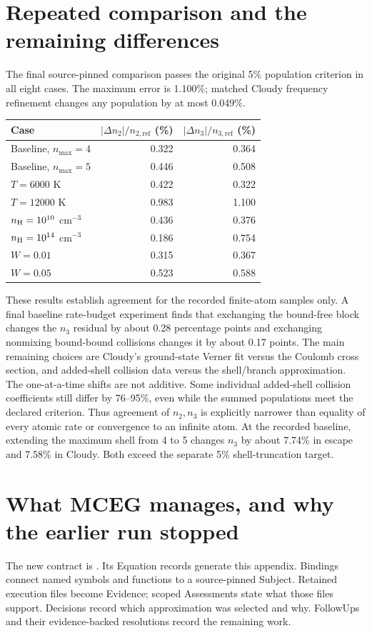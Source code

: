\documentclass[11pt,a4paper]{article}
\begin{document}
\section{Repeated comparison and the remaining differences}
The final source-pinned comparison passes the original 5\% population criterion
in all eight cases. The maximum error is 1.100\%; matched Cloudy frequency
refinement changes any population by at most 0.049\%.
\begin{center}
\begin{tabular}{lrr}
\toprule
Case & $|\Delta n_2|/n_{2,\mathrm{ref}}$ (\%) & $|\Delta n_3|/n_{3,\mathrm{ref}}$ (\%)\\
\midrule
Baseline, $n_{\max}=4$ & 0.322 & 0.364 \\
Baseline, $n_{\max}=5$ & 0.446 & 0.508 \\
$T=6000$ K & 0.422 & 0.322 \\
$T=12000$ K & 0.983 & 1.100 \\
$n_{\rm H}=10^{10}$ cm$^{-3}$ & 0.436 & 0.376 \\
$n_{\rm H}=10^{14}$ cm$^{-3}$ & 0.186 & 0.754 \\
$W=0.01$ & 0.315 & 0.367 \\
$W=0.05$ & 0.523 & 0.588 \\
\bottomrule
\end{tabular}
\end{center}
These results establish agreement for the recorded finite-atom samples only.
A final baseline rate-budget experiment finds that exchanging the bound-free
block changes the $n_3$ residual by about 0.28 percentage points and exchanging
nonmixing bound-bound collisions changes it by about 0.17 points. The main
remaining choices are Cloudy's ground-state Verner fit versus the Coulomb
cross section, and added-shell collision data versus the shell/branch
approximation. The one-at-a-time shifts are not additive. Some individual
added-shell collision coefficients still differ by 76--95\%, even while the
summed populations meet the declared criterion. Thus agreement of $n_2,n_3$
is explicitly narrower than equality of every atomic rate or convergence to
an infinite atom. At the recorded baseline, extending the maximum shell from
4 to 5 changes $n_3$ by about 7.74\% in escape and 7.58\% in Cloudy.
Both exceed the separate 5\% shell-truncation target.

\section{What MCEG manages, and why the earlier run stopped}
The new contract is .
Its Equation records generate this appendix. Bindings connect named symbols
and functions to a source-pinned Subject. Retained execution files become
Evidence; scoped Assessments state what those files support. Decisions record
which approximation was selected and why. FollowUps and their evidence-backed
resolutions record the remaining work.
\end{document}
